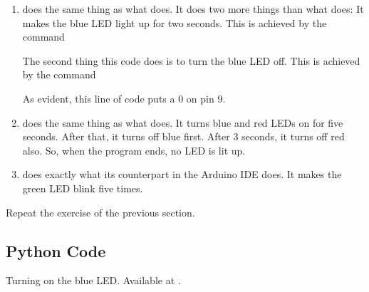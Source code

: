 \begin{enumerate}
  \item {} does the same thing as what  does. 
        It does two more things than what  does: It makes the blue LED light up for two
        seconds.  This is achieved by the command
        
        The second thing this code does is to turn the blue LED off.  This
        is achieved by the command
        
        As evident, this line of code puts a 0 on pin 9.
  \item {} does the same thing as what  does. 
         It turns blue and red LEDs on for five seconds.  After that, it turns off blue 
         first.  After 3 seconds, it turns off red also.  So, when the program ends, 
         no LED is lit up.
  
  \item {} does exactly what its counterpart in the Arduino IDE does.  
        It makes the green LED blink five times.
\end{enumerate}

\begin{exercise}
  Repeat the exercise of the previous section.
\end{exercise}

\subsection{Python Code}
\lstset{style=mystyle}
\label{sec:led-python-code}

\begin{pycode}
  {Turning on the blue LED. Available at
    .}
  \label{py:led-blue}
  
\end{pycode}

\begin{pycode}
  \label{py:led-blue-delay}
  
\end{pycode}

\begin{pycode}
  \label{py:led-blue-red}
  
\end{pycode}

\begin{pycode}
  \label{py:led-green-blink}
  
\end{pycode}

